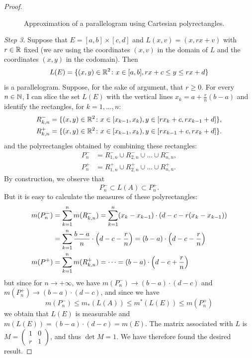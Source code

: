\begin{proof}
\begin{figure}
  {}
  \caption{Approximation of a parallelogram using Cartesian polyrectangles.}
\end{figure}

\emph{Step 3.}
Suppose that $E=[a,b]\times[c,d]$ and $L(x,v)=(x,rx+v)$ with $r\in {\mathbb R}$ fixed
(we are using the coordinates $(x,v)$ in the domain of $L$ and the coordinates
$(x,y)$ in the codomain). Then
\[
  L(E) = \{(x,y)\in {\mathbb R}^2\colon x\in[a,b], rx+c \le y \le rx+d\}
\]
is a parallelogram. Suppose, for the sake of argument, that $r\ge 0$. For every
$n\in {\mathbb N}$, I can slice the set $L(E)$ with the vertical lines $x_k =
a+\frac{r}{n}(b-a)$ and identify the rectangles, for $k=1,\dots, n$:
\begin{align*}
   R_{k,n}^-
   &= \{(x,y)\in {\mathbb R}^2 \colon x\in [x_{k-1},x_k), y\in[r x_k+c,r x_{k-1}+d]\},
   \\
   R_{k,n}^+
   &= \{(x,y)\in {\mathbb R}^2 \colon x\in [x_{k-1},x_k), y\in[r x_{k-1}+c,r x_k+d]\}.
\end{align*}
and the polyrectangles obtained by combining these rectangles:
\begin{align*}
  P^-_n &= R_{1,n}^- \cup R_{2,n}^- \cup \dots \cup R_{n,n}^-, \\
  P^+_n & = R_{1,n}^+ \cup R_{2,n}^+ \cup \dots \cup R_{n,n}^+.
\end{align*}
By construction, we observe that
\[
  P^-_n \subset L(A) \subset P^+_n.
\]
But it is easy to calculate the measures of these polyrectangles:
\begin{align*}
  m(P^-_n) &= \sum_{k=1}^n m(R_{k,n}^-)
          = \sum_{k=1}^n(x_k-x_{k-1})\cdot (d-c-r(x_k-x_{k-1}))\\
         &= \sum_{k=1}^n \frac {b-a} n \cdot {\left( d-c-\frac{r}{n} \right)}
          = (b-a)\cdot {\left( d-c-\frac{r}{n} \right)} \\
    m(P^+) &= \sum_{k=1}^n m(R_{k,n}^+) = \dots = (b-a)\cdot
  {\left( d-c+\frac{r}{n} \right)}
\end{align*}
but since for $n\to +\infty$, we have $m(P^-_n)\to (b-a)\cdot(d-c)$ and
$m(P^+_n) \to (b-a)\cdot(d-c)$, and since we have
\[
  m(P^-_n)\le m_*(L(A))\le m^*(L(E)) \le m(P^+_n)
\]
we obtain that $L(E)$ is measurable and $m(L(E)) = (b-a)\cdot(d-c) = m(E)$. The matrix associated with $L$ is $M=\begin{pmatrix}1 & 0 \\ r & 1 \end{pmatrix}$, and thus $\det M = 1$. We have therefore found the desired result.


\end{proof}
